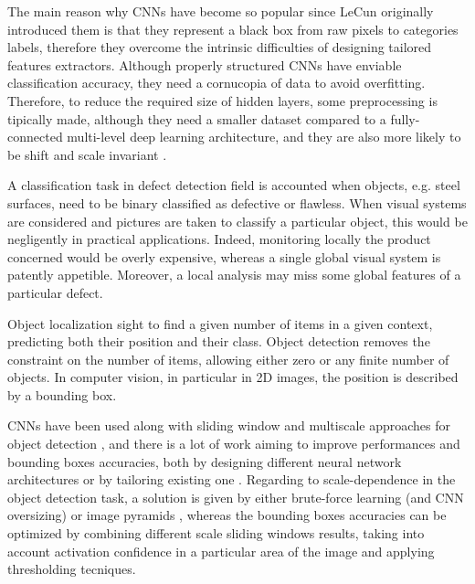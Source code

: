     \par{
        The main reason why CNNs have become so popular since LeCun originally introduced them \cite{nips:NIPS1989_293, ieee:726791, LeCun:1999:ORG:646469.691875, researchgate:deeplearning} is that they represent a black box from raw pixels to categories labels, therefore they overcome the intrinsic difficulties of designing tailored features extractors. Although properly structured CNNs have enviable classification accuracy, they need a cornucopia of data to avoid overfitting. Therefore, to reduce the required size of hidden layers, some preprocessing is tipically made, although they need a smaller dataset compared to a fully-connected multi-level deep learning architecture, and they are also more likely to be shift and scale invariant \cite{LeCun:1999:ORG:646469.691875}.
    }
    \par{
        A classification task in defect detection field is accounted when objects, e.g. steel surfaces, need to be binary classified as defective or flawless. When visual systems are considered and pictures are taken to classify a particular object, this would be negligently in practical applications. Indeed, monitoring locally the product concerned would be overly expensive, whereas a single global visual system is patently appetible. Moreover, a local analysis may miss some global features of a particular defect.
    }
    \par{
        Object localization sight to find a given number of items in a given context, predicting both their position and their class. Object detection removes the constraint on the number of items, allowing either zero or any finite number of objects. In computer vision, in particular in 2D images, the position is described by a bounding box.
    }
    \par{
        CNNs have been used along with sliding window and multiscale approaches for object detection \cite{ieee:7410526, ieee:7532516, arXiv:1312.6229S}, and there is a lot of work aiming to improve performances and bounding boxes accuracies, both by designing different neural network architectures \cite{ieee:7410526} or by tailoring existing one \cite{ieee:726791}. Regarding to scale-dependence in the object detection task, a solution is given by either brute-force learning (and CNN oversizing) or image pyramids \cite{ieee:7410526}, whereas the bounding boxes accuracies can be optimized by combining different scale sliding windows results, taking into account activation confidence in a particular area of the image and applying thresholding tecniques.
    }
